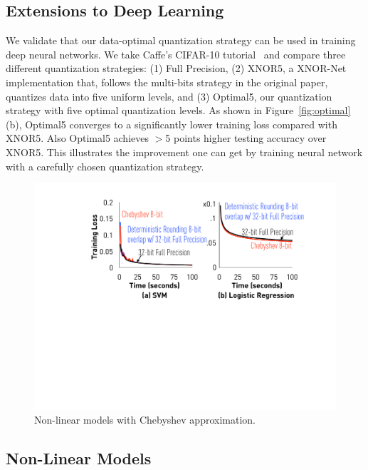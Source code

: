\documentclass{article}
\begin{document}
\vspace{-1em}
\subsection{Extensions to Deep Learning}
\vspace{-0.5em}

We validate that our data-optimal quantization
strategy can be used in training deep neural
networks. We take Caffe's CIFAR-10 tutorial~\cite{Caffe:CIFAR10}
and compare three different quantization
strategies: (1) Full Precision, (2) XNOR5, 
a XNOR-Net implementation that, follows
the multi-bits strategy in
the original paper, quantizes data into
five uniform levels, and (3)
Optimal5, our quantization strategy with
five optimal quantization levels. As
shown in Figure~\ref{fig:optimal}(b), Optimal5
converges to a significantly lower training 
loss compared with XNOR5. Also
Optimal5 achieves $>$5 points higher testing accuracy over XNOR5.
This illustrates the improvement
one can get by training neural network with
a carefully chosen quantization strategy.



\begin{figure}[t]
\centering
\includegraphics[width=0.7\columnwidth]{final-experiments/chebyshev} 
\vspace{-1.2em}
\caption{Non-linear models with Chebyshev approximation.}
\vspace{-1.9em}
\label{fig:chebyshev}
\end{figure}

\vspace{-1em}
\subsection{Non-Linear Models}
\vspace{-0.5em}
\end{document}
